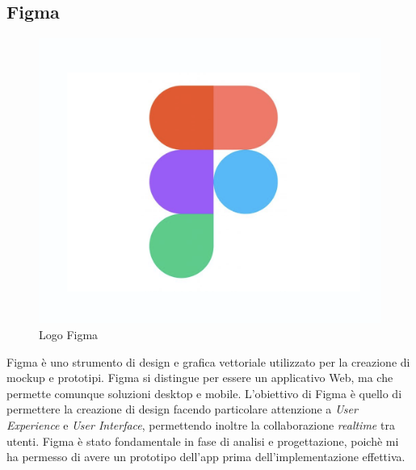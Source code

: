 \subsection{Figma}
\begin{figure}
    \centering
    \vspace{-20px}
    \includegraphics[scale=0.20]{img/figma.png}
    \caption{Logo Figma}
\end{figure}
    
Figma è uno strumento di design e grafica vettoriale utilizzato per la creazione di mockup e prototipi. Figma si distingue per essere un applicativo Web, ma che permette comunque soluzioni desktop e mobile. L'obiettivo di Figma è quello di permettere la creazione di design facendo particolare attenzione a \textit{User Experience} e \textit{User Interface}, permettendo inoltre la collaborazione \textit{realtime} tra utenti. Figma è stato fondamentale in fase di analisi e progettazione, poichè mi ha permesso di avere un prototipo dell'app prima dell'implementazione effettiva.

\pagebreak


